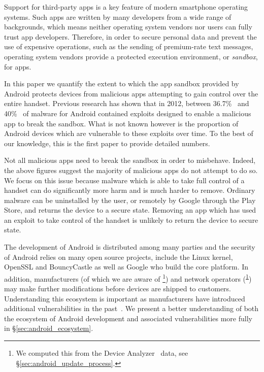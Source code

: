 \documentclass[conference,a4paper,twoside]{IEEEtran}
\newcommand{\da}{Device Analyzer}
\newcommand{\dafoot}{\textsuperscript{\ref{foot:dadata}}}
\newcommand{\percMarketShare}{83.6\%~\footnote{\url{http://www.theinquirer.net/inquirer/news/2379036/android-hits-836-percent-marketshare-while-ios-windows-and-blackberry-slide}}}
\begin{document}
Support for third-party apps is a key feature of modern smartphone operating systems.
Such apps are written by many developers from a wide range of backgrounds, which means neither operating system vendors nor users can fully trust app developers.
Therefore, in order to secure personal data and prevent the use of expensive operations, such as the sending of premium-rate text messages, operating system vendors provide a protected execution environment, or \emph{sandbox}, for apps.

In this paper we quantify the extent to which the app sandbox provided by Android protects devices from malicious apps attempting to gain control over the entire handset.
Previous research has shown that in 2012, between 36.7\%~\cite{Zhou2012b} and 40\%~\cite{Zhou2012a} of malware for Android contained exploits designed to enable a malicious app to break the sandbox.
What is not known however is the proportion of Android devices which are vulnerable to these exploits over time.
To the best of our knowledge, this is the first paper to provide detailed numbers.

Not all malicious apps need to break the sandbox in order to misbehave.
Indeed, the above figures suggest the majority of malicious apps do not attempt to do so.
We focus on this issue because malware which is able to take full control of a handset can do significantly more harm and is much harder to remove.
Ordinary malware can be uninstalled by the user, or remotely by Google through the Play Store, and returns the device to a secure state. 
Removing an app which has used an exploit to take control of the handset is unlikely to return the device to secure state.

The development of Android is distributed among many parties and the security of Android relies on many open source projects, include the Linux kernel, OpenSSL and BouncyCastle as well as Google who build the core platform. 
In addition, manufacturers (of which we are aware of \daNumManufacturers\footnote{\label{foot:dadata}We computed this from the \da~\cite{Wagner2013} data, see \S\ref{sec:android_update_process}.}) and network operators (\daNumOperators\dafoot) may make further modifications before devices are shipped to customers. 
Understanding this ecosystem is important as manufacturers have introduced additional vulnerabilities in the past~\cite{Grace2012}. 
We present a better understanding of both the ecosystem of Android development and associated vulnerabilities more fully in \S\ref{sec:android_ecosystem}.
 
\end{document}
